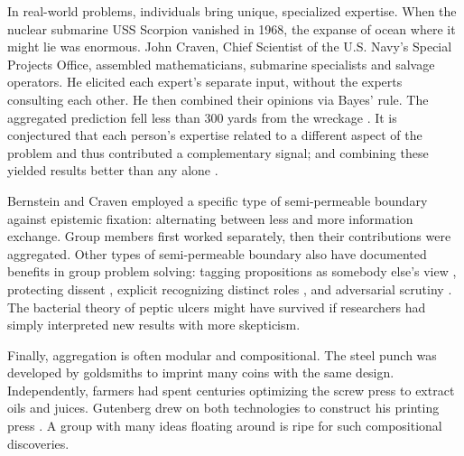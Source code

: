 \documentclass[11pt]{article}
\begin{document}
In real-world problems, individuals bring unique, specialized expertise. When the nuclear submarine USS Scorpion vanished in 1968, the expanse of ocean where it might lie was enormous. John Craven, Chief Scientist of the U.S. Navy's Special Projects Office, assembled mathematicians, submarine specialists and salvage operators. He elicited each expert's separate input, without the experts consulting each other. He then combined their opinions via Bayes' rule. The aggregated prediction fell less than 300 yards from the wreckage \citep{richardson1971operations, sontag1998blind}. It is conjectured that each person's expertise related to a different aspect of the problem and thus contributed a complementary signal; and combining these yielded results better than any alone \citep{surowiecki2005wisdom}.

Bernstein and Craven employed a specific type of semi-permeable boundary against epistemic fixation: alternating between less and more information exchange. Group members first worked separately, then their contributions were aggregated. Other types of semi-permeable boundary also have documented benefits in group problem solving: tagging propositions as somebody else's view \citep{johnson1993source}, protecting dissent \citep{sunstein2015wiser}, explicit recognizing distinct roles \citep{hutchins1995cognition}, and adversarial scrutiny \citep{longino1990science}. The bacterial theory of peptic ulcers might have survived if researchers had simply interpreted new results with more skepticism.

Finally, aggregation is often modular and compositional. The steel punch was developed by goldsmiths to imprint many coins with the same design. Independently, farmers had spent centuries optimizing the screw press to extract oils and juices. Gutenberg drew on both technologies to construct his printing press \citep{johnson2010where}. A group with many ideas floating around is ripe for such compositional discoveries.



\end{document}
